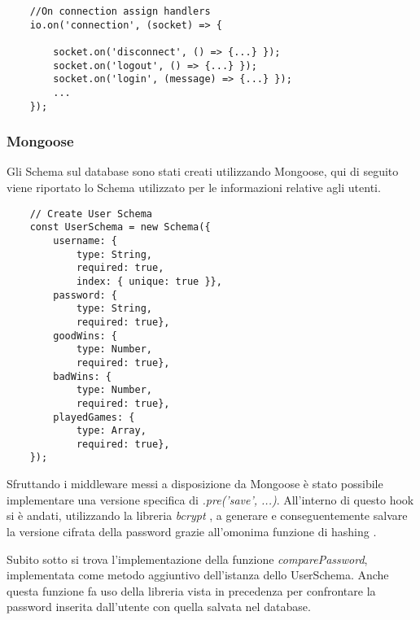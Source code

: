 \begin{verbatim}
    //On connection assign handlers
    io.on('connection', (socket) => {

        socket.on('disconnect', () => {...} });
        socket.on('logout', () => {...} });
        socket.on('login', (message) => {...} });
        ...
    });

\end{verbatim}

\subsubsection{Mongoose}
Gli Schema sul database sono stati creati utilizzando Mongoose, qui di seguito viene riportato lo Schema utilizzato per le informazioni relative agli utenti.
\begin{verbatim}
    // Create User Schema
    const UserSchema = new Schema({
        username: {
            type: String,
            required: true,
            index: { unique: true }},
        password: {
            type: String,
            required: true},
        goodWins: {
            type: Number,
            required: true},
        badWins: {
            type: Number,
            required: true},
        playedGames: {
            type: Array,
            required: true},
    });
\end{verbatim}

Sfruttando i middleware messi a disposizione da Mongoose è stato possibile implementare una versione specifica di \emph{.pre('save', ...)}. All'interno di questo hook si è andati, utilizzando la libreria \emph{bcrypt} \cite{npmjsBcrypt}, a generare e conseguentemente salvare la versione cifrata della password grazie all'omonima funzione di hashing \cite{bcryptWikipedia}. 

Subito sotto si trova l'implementazione della funzione \emph{comparePassword}, implementata come metodo aggiuntivo dell'istanza dello UserSchema. Anche questa funzione fa uso della libreria vista in precedenza per confrontare la password inserita dall'utente con quella salvata nel database. 

